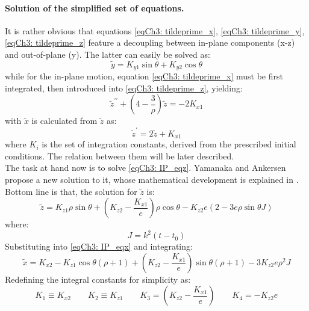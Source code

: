 	\paragraph{Solution of the simplified set of equations. \\}
	\indent It is rather obvious that equations \eqref{eqCh3: tildeprime_x}, \eqref{eqCh3: tildeprime_y}, \eqref{eqCh3: tildeprime_z} feature a decoupling between in-plane components (x-z) and out-of-plane (y). The latter can easily be solved as:
	\begin{equation}
	\widetilde{y} = K_{y1} \sin\theta + K_{y2} \cos\theta
	\label{eqCh3: OOP_sol}
	\end{equation}
	\noindent while for the in-plane motion, equation \eqref{eqCh3: tildeprime_x} must be first integrated, then introduced into \eqref{eqCh3: tildeprime_z}, yielding:
	\begin{equation}
	\widetilde{z}^{\prime\prime} + \left( 4 - \dfrac{3}{\rho} \right) \widetilde{z} = - 2 K_{x1}
	\label{eqCh3: IP_eqz}
	\end{equation} 
	\noindent with $\widetilde{x}$ is calculated from $\widetilde{z}$ as:
	\begin{equation}
	\widetilde{z}^{\prime} = 2 \widetilde{z} + K_{x1}
	\label{eqCh3: IP_eqx}
	\end{equation}
	\noindent where $K_i$ is the set of integration constants, derived from the prescribed initial conditions. The relation between them will be later described.\\
	\indent The task at hand now is to solve \eqref{eqCh3: IP_eqz}. Yamanaka and Ankersen propose a new solution to it, whose mathematical development is explained in  \cite{Yamanaka_ankersen}. Bottom line is that, the solution for $\widetilde{z}$ is:
	\begin{equation}
	\widetilde{z} = K_{z1} \rho\sin\theta + \left(K_{z2} - \dfrac{K_{x1}}{e}\right) \rho\cos\theta - K_{z2} e\left(2 - 3 e\rho\sin\theta J\right)
	\label{eqCh3: z_tilde}
	\end{equation}
	\noindent where:
	\[
	J = k^2 (t - t_0)
	\]	
	Substituting into \eqref{eqCh3: IP_eqx} and integrating:
	\begin{equation}
	\widetilde{x} = K_{x2} - K_{z1} \cos\theta \left(\rho + 1\right) + \left(K_{z2} - \dfrac{K_{x1}}{e}\right) \sin\theta \left(\rho + 1\right) - 3 K_{z2} e\rho^2 J
	\end{equation}	
	\indent Redefining the integral constants for simplicity as:
	\[
	K_1 \equiv K_{x2} \qquad K_2 \equiv K_{z1} \qquad K_3 = \left(K_{z2} - \dfrac{K_{x1}}{e}\right) \qquad K_{4} = - K_{z2} e
	\]
